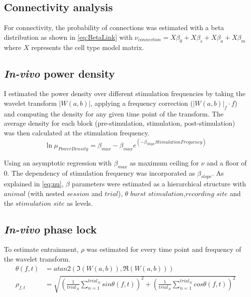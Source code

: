\documentclass[
  12pt,
  a4paper,
  openany]{book}
\begin{document}
\hypertarget{connectivity-analysis}{%
\subsection{Connectivity analysis}\label{connectivity-analysis}}

For connectivity, the probability of connections was estimated with a beta distribution as shown in \eqref{eq:BetaLink} with \(\nu_{connection} = X\beta_{0}+X\beta_{s}+X\beta_{a}+X\beta_{m}\) where \(X\) represents the cell type model matrix.

\hypertarget{in-vivo-power-density}{%
\subsection{\texorpdfstring{\emph{In-vivo} power density}{In-vivo power density}}\label{in-vivo-power-density}}

I estimated the power density over different stimulation frequencies by taking the wavelet transform \(\left|W(a,b)\right|\), applying a frequency correction (\(\left|W(a,b)\right|_{f}\cdot f\)) and computing the density for any given time point of the transform. The average density for each block (pre-stimulation, stimulation, post-stimulation) was then calculated at the stimulation frequency. \begin{equation}
\ln{\mu_{Power Density}} = \beta_{max}-\beta_{max} e^{(-\beta_{Slope} StimulationFrequency)}
\label{eq:AsymPower}
\end{equation}

\noindent
Using an asymptotic regression with \(\beta_{max}\) as maximum ceiling for \(\nu\) and a floor of \(0\). The dependency of stimulation frequency was incorporated as \(\beta_{slope}\). As explained in \eqref{eq:nu}, \(\beta\) parameters were estimated as a hierarchical structure with \(animal\) (with nested \(session\) and \(trial\)), \(\theta\) \(burst\) \(stimulation\),\(recording\) \(site\) and the \(stimulation\) \(site\) as levels.

\hypertarget{in-vivo-phase-lock}{%
\subsection{\texorpdfstring{\emph{In-vivo} phase lock}{In-vivo phase lock}}\label{in-vivo-phase-lock}}

To estimate entrainment, \(\rho\) was estimated for every time point and frequency of the wavelet transform. \begin{align}
\theta(f,t) &= atan2(\Im(W(a,b)), \Re(W(a,b))) \label{eq:phaseInvivo} \\
\rho_{f,t} &=\sqrt{\left(\frac{1}{trial_{N}} \sum_{n=1}^{trial_{N}} sin \theta(f,t)\right)^2 + \left(\frac{1}{trial_{N}} \sum_{n=1}^{trial_{N}} cos \theta(f,t)\right)^2 } \label{eq:rhoInVivo}
\end{align}
\end{document}
